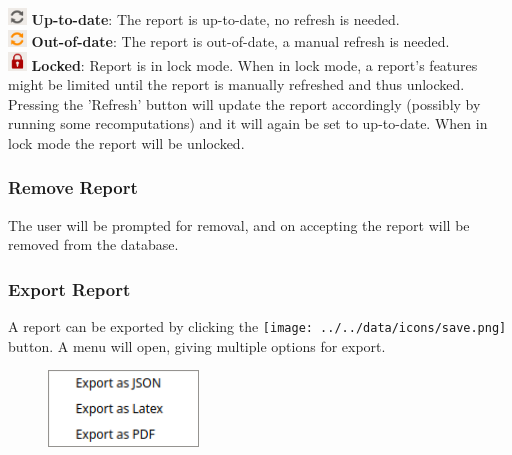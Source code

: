 \includegraphics[width=0.5cm,frame]{figures/refresh_uptodate.png} \textbf{Up-to-date}: The report is up-to-date, no refresh is needed. \\

\includegraphics[width=0.5cm,frame]{figures/refresh_needed.png} \textbf{Out-of-date}: The report is out-of-date, a manual refresh is needed. \\

\includegraphics[width=0.5cm,frame]{figures/refresh_lock.png} \textbf{Locked}: Report is in lock mode. 
When in lock mode, a report's features might be limited until the report is manually refreshed and thus unlocked. \\

Pressing the 'Refresh' button will update the report accordingly (possibly by running some recomputations) and it will again be set to up-to-date.
When in lock mode the report will be unlocked.

\subsubsection{Remove Report}
\label{sec:report_delete}

The user will be prompted for removal, and on accepting the report will be removed from the database.

\subsubsection{Export Report}
\label{sec:report_export}

A report can be exported by clicking the \texttt{[image: ../../data/icons/save.png]} button.
A menu will open, giving multiple options for export.

\begin{figure}[H]
    \center
    \includegraphics[width=4cm,frame]{figures/export_options.png}
\end{figure}

